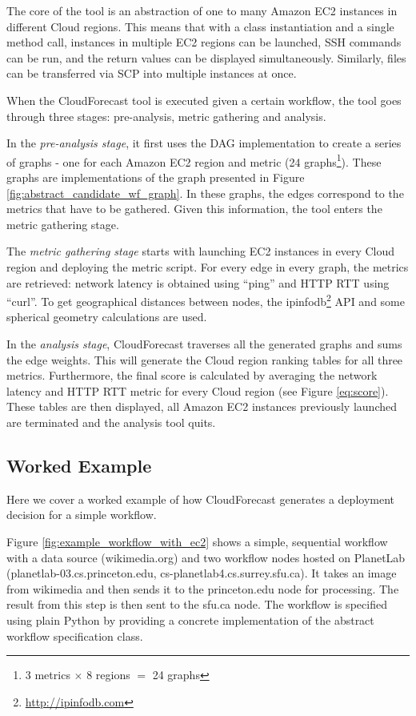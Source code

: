 \documentclass[10pt, conference, compsocconf]{IEEEtran}
\newcommand{\sysname}{CloudForecast\xspace}
\begin{document}
The core of the tool is an abstraction of one to many Amazon EC2 instances in different Cloud regions. This means that with a class instantiation and a single method call, instances in multiple EC2 regions can be launched, SSH commands can be run, and the return values can be displayed simultaneously. Similarly, files can be transferred via SCP into multiple instances at once.

When the \sysname tool is executed given a certain workflow, the tool goes through three stages: pre-analysis, metric gathering and analysis.

In the \emph{pre-analysis stage}, it first uses the DAG implementation to create a series of graphs - one for each Amazon EC2 region and metric (24 graphs\footnote{3 metrics $\times$ 8 regions $=$ 24 graphs}). These graphs are implementations of the graph presented in Figure \ref{fig:abstract_candidate_wf_graph}. In these graphs, the edges correspond to the metrics that have to be gathered. Given this information, the tool enters the metric gathering stage.

The \emph{metric gathering stage} starts with launching EC2 instances in every Cloud region and deploying the metric script. For every edge in every graph, the metrics are retrieved: network latency is obtained using ``ping'' and HTTP RTT using ``curl''. To get geographical distances between nodes, the ipinfodb\footnote{\url{http://ipinfodb.com}} API and some spherical geometry calculations are used.

In the \emph{analysis stage}, \sysname traverses all the generated graphs and sums the edge weights. This will generate the Cloud region ranking tables for all three metrics. Furthermore, the final score is calculated by averaging the network latency and HTTP RTT metric for every Cloud region (see Figure \ref{eq:score}). These tables are then displayed, all Amazon EC2 instances previously launched are terminated and the analysis tool quits.

\subsection{Worked Example}
Here we cover a worked example of how \sysname generates a deployment decision for a simple workflow.





Figure \ref{fig:example_workflow_with_ec2} shows a simple, sequential workflow with a data source (wikimedia.org) and two workflow nodes hosted on PlanetLab (planetlab-03.cs.princeton.edu, cs-planetlab4.cs.surrey.sfu.ca). It takes an image from wikimedia and then sends it to the princeton.edu node for processing. The result from this step is then sent to the sfu.ca node. The workflow is specified using plain Python by providing a concrete implementation of the abstract workflow specification class.
\end{document}
